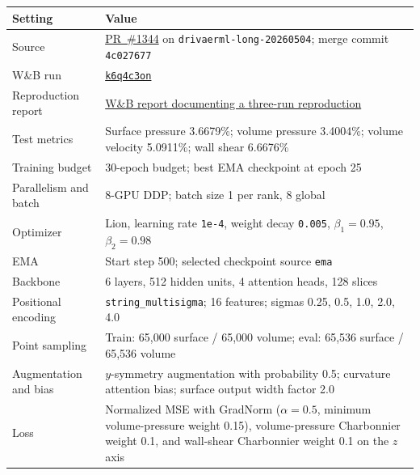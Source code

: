 \documentclass{article}
\begin{document}
\begin{center}
  \label{tab:app-drivaerml-config}
  \small
  \begin{tabular}{@{}p{}p{}@{}}
    \toprule
    Setting & Value \\
    \midrule
    Source & \href{https://github.com/morganmcg1/DrivAerML/pull/1344}{PR~\#1344} on \texttt{drivaerml-long-20260504}; merge commit \texttt{4c027677} \\
    W\&B run & \href{https://wandb.ai/wandb-applied-ai-team/senpai-v1-drivaerml-ddp8/runs/k6q4c3on}{\texttt{k6q4c3on}} \\
    Reproduction report & \href{https://wandb.ai/wandb-applied-ai-team/senpai-v1-drivaerml-ddp8/reports/-2026-06-22-DrivAerML-H147-Repro-vs-Volume-Velocity-Targets--VmlldzoxNzI3MTE5MQ}{W\&B report documenting a three-run reproduction} \\
    Test metrics & Surface pressure 3.6679\%; volume pressure 3.4004\%; volume velocity 5.0911\%; wall shear 6.6676\% \\
    Training budget & 30-epoch budget; best EMA checkpoint at epoch 25 \\
    Parallelism and batch & 8-GPU DDP; batch size 1 per rank, 8 global \\
    Optimizer & Lion, learning rate \texttt{1e-4}, weight decay \texttt{0.005}, $\beta_1=0.95$, $\beta_2=0.98$ \\
    EMA & Start step 500; selected checkpoint source \texttt{ema} \\
    Backbone & 6 layers, 512 hidden units, 4 attention heads, 128 slices \\
    Positional encoding & \texttt{string\_multisigma}; 16 features; sigmas 0.25, 0.5, 1.0, 2.0, 4.0 \\
    Point sampling & Train: 65,000 surface / 65,000 volume; eval: 65,536 surface / 65,536 volume \\
    Augmentation and bias & $y$-symmetry augmentation with probability 0.5; curvature attention bias; surface output width factor 2.0 \\
    Loss & Normalized MSE with GradNorm ($\alpha=0.5$, minimum volume-pressure weight 0.15), volume-pressure Charbonnier weight 0.1, and wall-shear Charbonnier weight 0.1 on the $z$ axis \\
    \bottomrule
  \end{tabular}
\end{center}
\end{document}
